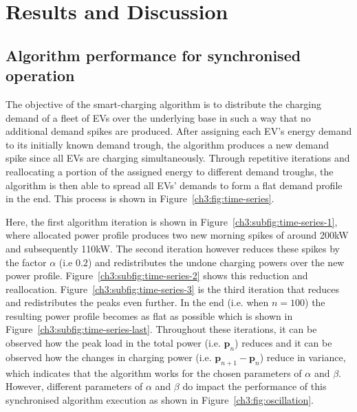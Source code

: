\section{Results and Discussion}
\label{ch3:sec:results}

\subsection{Algorithm performance for synchronised operation}
\label{ch3:subsec:algorithm-performance-synchronised}

The objective of the smart-charging algorithm is to distribute the charging demand of a fleet of EVs over the underlying base in such a way that no additional demand spikes are produced.
After assigning each EV's energy demand to its initially known demand trough, the algorithm produces a new demand spike since all EVs are charging simultaneously.
Through repetitive iterations and reallocating a portion of the assigned energy to different demand troughs, the algorithm is then able to spread all EVs' demands to form a flat demand profile in the end.
This process is shown in Figure~\ref{ch3:fig:time-series}.





Here, the first algorithm iteration is shown in Figure~\ref{ch3:subfig:time-series-1}, where allocated power profile produces two new morning spikes of around 200kW and subsequently 110kW.
The second iteration however reduces these spikes by the factor $\alpha$ (i.e $0.2$) and redistributes the undone charging powers over the new power profile.
Figure~\ref{ch3:subfig:time-series-2} shows this reduction and reallocation.
Figure~\ref{ch3:subfig:time-series-3} is the third iteration that reduces and redistributes the peaks even further.
In the end (i.e. when $n=100$) the resulting power profile becomes as flat as possible which is shown in Figure~\ref{ch3:subfig:time-series-last}.
Throughout these iterations, it can be observed how the peak load in the total power (i.e. $\textbf{p}_n$) reduces and it can be observed how the changes in charging power (i.e. $\textbf{p}_{n+1}-\textbf{p}_n$) reduce in variance, which indicates that the algorithm works for the chosen parameters of $\alpha$ and $\beta$.
However, different parameters of $\alpha$ and $\beta$ do impact the performance of this synchronised algorithm execution as shown in Figure~\ref{ch3:fig:oscillation}.

